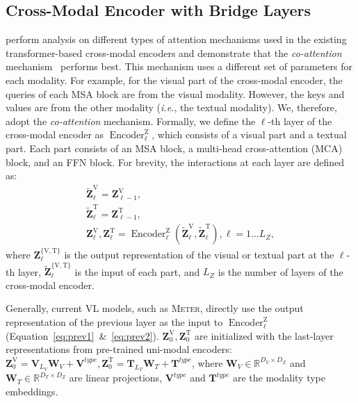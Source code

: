 \documentclass[letterpaper]{article} %
\newcommand{\metername}[0]{\textsc{Meter}}
\newcommand{\coattention}[0]{\textit{co-attention}}
\newcommand{\ie}[0]{\textit{i.e.},}
\begin{document}
\subsection{Cross-Modal Encoder with Bridge Layers} 
\label{sec:bridge-layers}
\citet{hendricks2021decoupling} perform analysis on different types of attention mechanisms used in the existing transformer-based cross-modal encoders and demonstrate that the \coattention{} mechanism~\citep{lu2019vilbert} performs best. 
This mechanism uses a different set of parameters for each modality. 
For example, for the visual part of the cross-modal encoder, the queries of each MSA block are from the visual modality. However, the keys and values are from the other modality (\ie{} the textual modality). 
We, therefore, adopt the \coattention{} mechanism. 
Formally, we define the $\ell$-th layer of the cross-modal encoder as $\operatorname{Encoder}^\mathrm{Z}_\ell$, which consists of a visual part and a textual part. 
Each part consists of an MSA block, a multi-head cross-attention (MCA) block, and an FFN block. 
For brevity, the interactions at each layer are defined as:
\begin{gather}
    \tilde{\mathbf{Z}}^\mathrm{V}_{\ell} = {\mathbf{Z}}^\mathrm{V}_{\ell-1}, \label{eq:prev1} \\
    \tilde{\mathbf{Z}}^\mathrm{T}_{\ell} = {\mathbf{Z}}^\mathrm{T}_{\ell-1}, \label{eq:prev2} \\
    \mathbf{Z}^\mathrm{V}_{\ell}, \mathbf{Z}^\mathrm{T}_{\ell}= \operatorname{Encoder}^\mathrm{Z}_\ell(\tilde{\mathbf{Z}}^\mathrm{V}_{\ell}, \tilde{\mathbf{Z}}^\mathrm{T}_{\ell}), \ell = 1 \dots L_Z,
\end{gather}
where $\mathbf{Z}^\mathrm{\{\mathrm{V},\mathrm{T}\}}_{\ell}$ is the output representation of the visual or textual part at the $\ell$-th layer, $\tilde{\mathbf{Z}}^\mathrm{\{\mathrm{V},\mathrm{T}\}}_{\ell}$ is the input of each part, and $L_Z$ is the number of layers of the cross-modal encoder.

Generally, current VL models, such as \metername{}, directly use the output representation of the previous layer as the input to $\operatorname{Encoder}^\mathrm{Z}_\ell$ (Equation~\ref{eq:prev1}~\&~\ref{eq:prev2}). 
$\mathbf{Z}^\mathrm{V}_{0}, \mathbf{Z}^\mathrm{T}_{0}$ are initialized with the last-layer representations from pre-trained uni-modal encoders:  $\mathbf{Z}^\mathrm{V}_{0} = \mathbf{V}_{L_V}\mathbf{W}_V + \mathbf{V}^{type}, \mathbf{Z}^\mathrm{T}_{0} = \mathbf{T}_{L_T}\mathbf{W}_T + \mathbf{T}^{type}$, where $\mathbf{W}_V \in \mathbb{R}^{D_V \times D_Z}$ and $\mathbf{W}_T \in \mathbb{R}^{D_T \times D_Z}$ are linear projections, $\mathbf{V}^{type}$ and $\mathbf{T}^{type}$ are the modality type embeddings.
\end{document}
